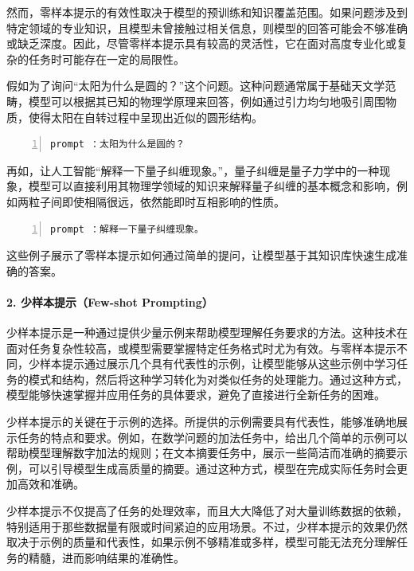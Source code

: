 然而，零样本提示的有效性取决于模型的预训练和知识覆盖范围。如果问题涉及到特定领域的专业知识，且模型未曾接触过相关信息，则模型的回答可能会不够准确或缺乏深度。因此，尽管零样本提示具有较高的灵活性，它在面对高度专业化或复杂的任务时可能存在一定的局限性。

假如为了询问“太阳为什么是圆的？”这个问题。这种问题通常属于基础天文学范畴，模型可以根据其已知的物理学原理来回答，例如通过引力均匀地吸引周围物质，使得太阳在自转过程中呈现出近似的圆形结构。

\begin{lstlisting}[language={python},label={},caption={}, basicstyle=\footnotesize\ttfamily, breaklines=true, numbers=left, frame=single]
prompt ：太阳为什么是圆的？  
\end{lstlisting}

再如，让人工智能“解释一下量子纠缠现象。”，量子纠缠是量子力学中的一种现象，模型可以直接利用其物理学领域的知识来解释量子纠缠的基本概念和影响，例如两粒子间即使相隔很远，依然能即时互相影响的性质。

\begin{lstlisting}[language={python},label={},caption={}, basicstyle=\footnotesize\ttfamily, breaklines=true, numbers=left, frame=single]
prompt ：解释一下量子纠缠现象。  
\end{lstlisting}

这些例子展示了零样本提示如何通过简单的提问，让模型基于其知识库快速生成准确的答案。

\paragraph{2. 少样本提示（Few-shot Prompting）} 

少样本提示是一种通过提供少量示例来帮助模型理解任务要求的方法。这种技术在面对任务复杂性较高，或模型需要掌握特定任务格式时尤为有效。与零样本提示不同，少样本提示通过展示几个具有代表性的示例，让模型能够从这些示例中学习任务的模式和结构，然后将这种学习转化为对类似任务的处理能力。通过这种方式，模型能够快速掌握并应用任务的具体要求，避免了直接进行全新任务的困难。

少样本提示的关键在于示例的选择。所提供的示例需要具有代表性，能够准确地展示任务的特点和要求。例如，在数学问题的加法任务中，给出几个简单的示例可以帮助模型理解数字加法的规则；在文本摘要任务中，展示一些简洁而准确的摘要示例，可以引导模型生成高质量的摘要。通过这种方式，模型在完成实际任务时会更加高效和准确。

少样本提示不仅提高了任务的处理效率，而且大大降低了对大量训练数据的依赖，特别适用于那些数据量有限或时间紧迫的应用场景。不过，少样本提示的效果仍然取决于示例的质量和代表性，如果示例不够精准或多样，模型可能无法充分理解任务的精髓，进而影响结果的准确性。

